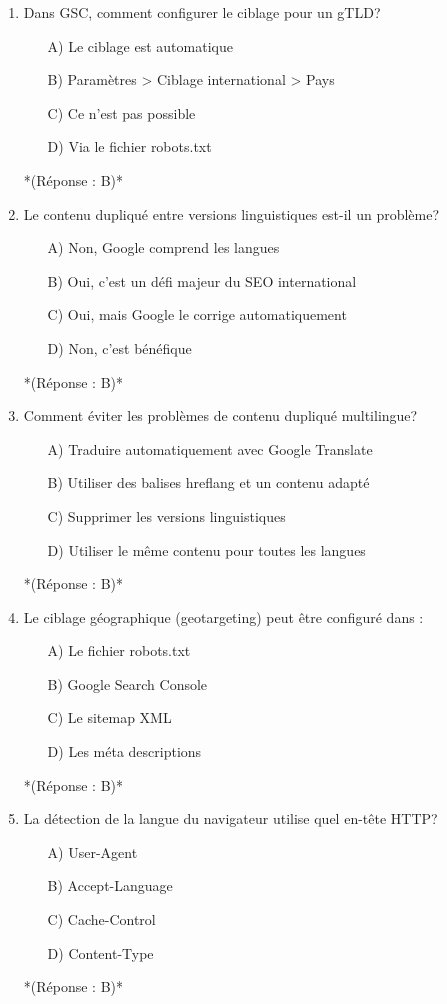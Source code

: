 \documentclass[12pt,a4paper,twoside]{report}
\begin{document}
\begin{enumerate}
\item Dans GSC, comment configurer le ciblage pour un gTLD?
\begin{itemize}
\item[A)] Le ciblage est automatique
\item[B)] Paramètres > Ciblage international > Pays
\item[C)] Ce n'est pas possible
\item[D)] Via le fichier robots.txt
\end{itemize}
*(Réponse : B)*

\item Le contenu dupliqué entre versions linguistiques est-il un problème?
\begin{itemize}
\item[A)] Non, Google comprend les langues
\item[B)] Oui, c'est un défi majeur du SEO international
\item[C)] Oui, mais Google le corrige automatiquement
\item[D)] Non, c'est bénéfique
\end{itemize}
*(Réponse : B)*

\item Comment éviter les problèmes de contenu dupliqué multilingue?
\begin{itemize}
\item[A)] Traduire automatiquement avec Google Translate
\item[B)] Utiliser des balises hreflang et un contenu adapté
\item[C)] Supprimer les versions linguistiques
\item[D)] Utiliser le même contenu pour toutes les langues
\end{itemize}
*(Réponse : B)*

\item Le ciblage géographique (geotargeting) peut être configuré dans :
\begin{itemize}
\item[A)] Le fichier robots.txt
\item[B)] Google Search Console
\item[C)] Le sitemap XML
\item[D)] Les méta descriptions
\end{itemize}
*(Réponse : B)*

\item La détection de la langue du navigateur utilise quel en-tête HTTP?
\begin{itemize}
\item[A)] User-Agent
\item[B)] Accept-Language
\item[C)] Cache-Control
\item[D)] Content-Type
\end{itemize}
*(Réponse : B)*


\end{enumerate}
\end{document}
